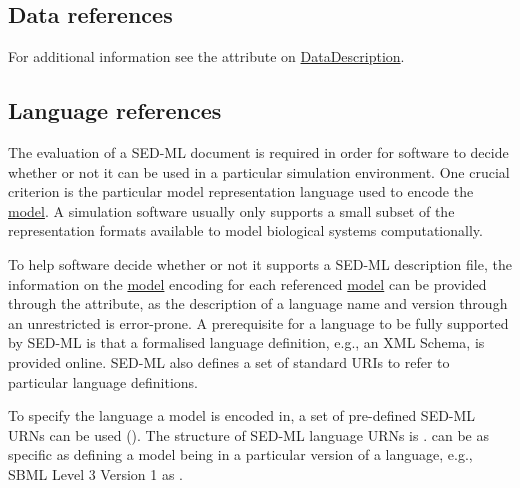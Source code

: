 \subsection{Data references}
\label{sec:dataURI}


For additional information see the \hyperref[sec:data_source]{} attribute on \hyperref[class:dataDescription]{DataDescription}.

\subsection{Language references}
\label{sec:languageURI}
The evaluation of a SED-ML document is required in order for software to decide whether or not it can be used in a particular simulation environment. One crucial criterion is the particular model representation language used to encode the \hyperref[class:model]{model}. A simulation software usually only supports a small subset of the representation formats available to model biological systems computationally. 

To help  software decide whether or not it supports a SED-ML description file, the information on the \hyperref[class:model]{model} encoding for each referenced \hyperref[class:model]{model} can be provided through the \hyperref[sec:language]{} attribute, as the description of a language name and version through an unrestricted  is error-prone. 
A prerequisite for a language to be fully supported by SED-ML is that a formalised language definition, e.g., an XML Schema, is provided online. SED-ML also defines a set of standard URIs to refer to particular language definitions. 

To specify the language a model is encoded in, a set of pre-defined SED-ML URNs can be used (). The structure of SED-ML language URNs is \emph{}.  can be as specific as defining a model being in a particular version of a language, e.g., SBML Level 3 Version 1 as .

